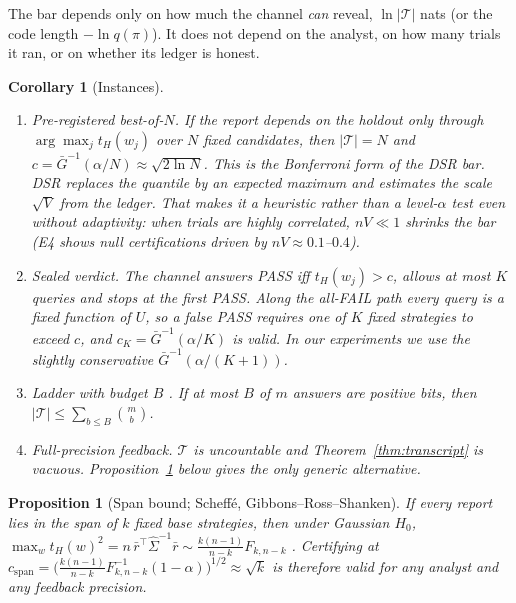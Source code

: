 \documentclass[11pt]{article}
\newtheorem{proposition}[theorem]{Proposition}
\newtheorem{corollary}[theorem]{Corollary}
\theoremstyle{definition}
\theoremstyle{remark}
\newcommand{\tH}{t_{H}}
\newcommand{\cT}{\mathcal{T}}
\begin{document}
The bar depends only on how much the channel \emph{can} reveal, $\ln|\cT|$ nats (or the code length $-\ln q(\pi)$). It does not depend on the analyst, on how many trials it ran, or on whether its ledger is honest.

\begin{corollary}[Instances]\label{cor:instances}
\begin{enumerate}[label=(\roman*),leftmargin=*,itemsep=1pt]
\item \emph{Pre-registered best-of-$N$.} If the report depends on the holdout only through $\arg\max_j\tH(w_j)$ over $N$ fixed candidates, then $|\cT|=N$ and $c=\bar G^{-1}(\alpha/N)\approx\sqrt{2\ln N}$. This is the Bonferroni form of the DSR bar. DSR replaces the quantile by an expected maximum and estimates the scale $\sqrt V$ from the ledger. That makes it a heuristic rather than a level-$\alpha$ test even without adaptivity: when trials are highly correlated, $nV\ll1$ shrinks the bar (E4 shows null certifications driven by $nV\approx0.1$--$0.4$).
\item \emph{Sealed verdict.} The channel answers PASS iff $\tH(w_j)>c$, allows at most $K$ queries and stops at the first PASS. Along the all-FAIL path every query is a fixed function of $U$, so a false PASS requires one of $K$ fixed strategies to exceed $c$, and $c_K=\bar G^{-1}(\alpha/K)$ is valid. In our experiments we use the slightly conservative $\bar G^{-1}(\alpha/(K+1))$.
\item \emph{Ladder with budget $B$} \citep{blum2015ladder}. If at most $B$ of $m$ answers are positive bits, then $|\cT|\le\sum_{b\le B}\binom mb$.
\item \emph{Full-precision feedback.} $\cT$ is uncountable and Theorem~\ref{thm:transcript} is vacuous. Proposition~\ref{prop:span} below gives the only generic alternative.
\end{enumerate}
\end{corollary}

\begin{proposition}[Span bound; Scheff\'e, Gibbons--Ross--Shanken]\label{prop:span}
If every report lies in the span of $k$ fixed base strategies, then under Gaussian $H_0$, $\max_{w}\tH(w)^2=n\,\bar r^\top\hat\Sigma^{-1}\bar r\sim\frac{k(n-1)}{n-k}F_{k,n-k}$ \citep{scheffe1953method,gibbons1989test}. Certifying at $c_{\mathrm{span}}=\big(\frac{k(n-1)}{n-k}F^{-1}_{k,n-k}(1-\alpha)\big)^{1/2}\approx\sqrt k$ is therefore valid for \emph{any} analyst and \emph{any} feedback precision.
\end{proposition}
\end{document}
